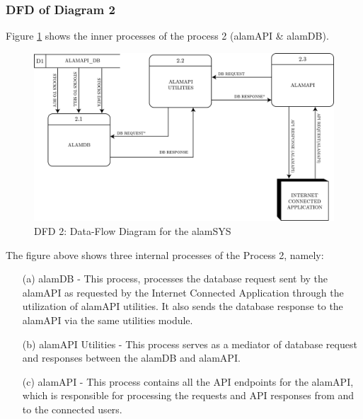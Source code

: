 \subsubsection{DFD of Diagram 2}
\label{subsubsec:dfd2}
Figure \ref{fig:dfd2} shows the inner processes of the process 2 (alamAPI \& alamDB).
\begin{figure}[ht]
    \centering
    \includegraphics[width=1\textwidth]{./assets/Chapter_3/DFD/DFD_2.png}
    \caption{DFD 2: Data-Flow Diagram for the alamSYS}
    \label{fig:dfd2}
\end{figure}
\FloatBarrier
\vspace{0.5cm}
The figure above shows three internal processes of the Process 2, namely:
\begin{itemize}
    \item[(a)] alamDB - This process, processes the database request sent by the alamAPI as requested by the
    Internet Connected Application through the utilization of alamAPI utilities. It also sends the database
    response to the alamAPI via the same utilities module.
    \item[(b)] alamAPI Utilities - This process serves as a mediator of database request and responses
    between the alamDB and alamAPI.
    \item[(c)] alamAPI - This process contains all the API endpoints for the alamAPI, which is responsible
    for processing the requests and API responses from and to the connected users.
\end{itemize}